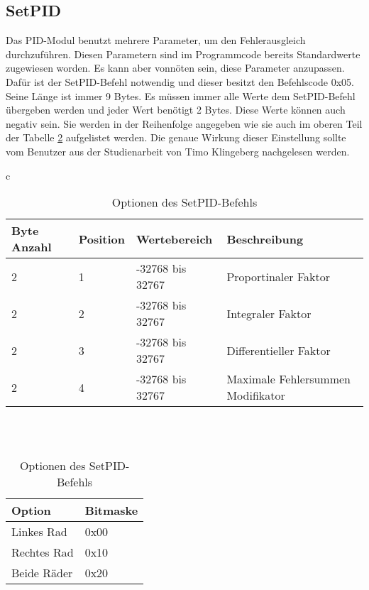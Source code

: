 \subsection{SetPID}
Das PID-Modul benutzt mehrere Parameter, um den Fehlerausgleich durchzuführen. Diesen
Parametern sind im Programmcode bereits Standardwerte zugewiesen worden. Es kann aber
vonnöten sein, diese Parameter anzupassen. Dafür ist der SetPID-Befehl notwendig und
dieser besitzt den Befehlscode 0x05. Seine Länge ist immer 9 Bytes. Es müssen
immer alle Werte dem SetPID-Befehl übergeben werden und jeder Wert benötigt 2 Bytes.
Diese Werte können auch negativ sein. Sie werden in der Reihenfolge angegeben
wie sie auch im oberen Teil der Tabelle \ref{protocol_setpid} aufgelistet werden.
Die genaue Wirkung dieser Einstellung sollte vom Benutzer aus der Studienarbeit von
Timo Klingeberg \cite{STUD_TIMO} nachgelesen werden.
\begin{table}[htb]
\begin{center}
	\begin{tabular}{c}
	\begin{tabularx}{\linewidth}{|l|l|l|X|}
		\hline
		\textbf{Byte Anzahl} & \textbf{Position} & \textbf{Wertebereich} & \textbf{Beschreibung} \\
		\hline
		\hline
		2					 & 1 & -32768 bis 32767 & Proportinaler Faktor\\
		\hline
		2					 & 2 & -32768 bis 32767 & Integraler Faktor\\
		\hline
		2					 & 3 & -32768 bis 32767 & Differentieller Faktor\\
		\hline
		2					 & 4 & -32768 bis 32767 & Maximale Fehlersummen Modifikator\\
		\hline
	\end{tabularx}\\
	\\
	\begin{tabularx}{\linewidth}{|l|X|}
		\hline
		\textbf{Option} & \textbf{Bitmaske} \\
		\hline
		\hline
		Linkes Rad	& 0x00 \\
		\hline
		Rechtes Rad	& 0x10 \\
		\hline
		Beide Räder & 0x20 \\
		\hline
	\end{tabularx}
	\end{tabular}
	\caption{\label{protocol_setpid} Optionen des SetPID-Befehls}
\end{center}
\end{table}

